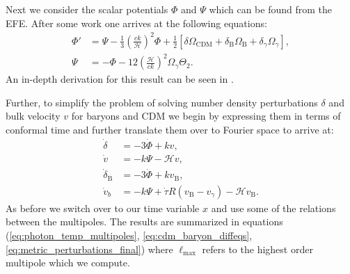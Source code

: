 \documentclass[%
reprint,
 amsmath,amssymb,
 aps,
]{revtex4-2}
\newcommand{\Hp}{\mathcal{H}}
\begin{document}
Next we consider the scalar potentials $\Phi$ and $\Psi$ which can be found from the EFE. After some work one arrives at the following equations:
\begin{align*}
	\Phi'&=\Psi-\frac{1}{3}\left(\frac{ck}{\Hp}\right)^2\Phi+\frac{1}{2}\left[\delta\Omega_\text{CDM}+\delta_\text{B}\Omega_\text{B}+\delta_\gamma\Omega_\gamma\right],\\
	\Psi&=-\Phi-12\left(\frac{\Hp}{ck}\right)^2\Omega_\gamma\Theta_2.
\end{align*}
An in-depth derivation for this result can be seen in \cite{Dodelson:2003ft}.

Further, to simplify the problem of solving number density perturbations $\delta$ and bulk velocity $v$ for baryons and CDM we begin by expressing them in terms of conformal time and further translate them over to Fourier space to arrive at:
\begin{align*}
	\dot\delta&=-3\dot\Phi+kv,\\
	\dot v&=-k\Psi-\Hp v,\\
	\dot\delta_\text{B}&=-3\dot\Phi+kv_\text{B},\\
	\dot v_b&=-k\Psi+\dot\tau R(v_\text{B}-v_\gamma)-\Hp v_\text{B}.
\end{align*} 
As before we switch over to our time variable $x$ and use some of the relations between the multipoles. The results are summarized in equations (\ref{eq:photon_temp_multipoles}, \ref{eq:cdm_baryon_diffeqs}, \ref{eq:metric_perturbations_final}) where $\ell_\text{max}$ refers to the highest order multipole which we compute. 
\end{document}
